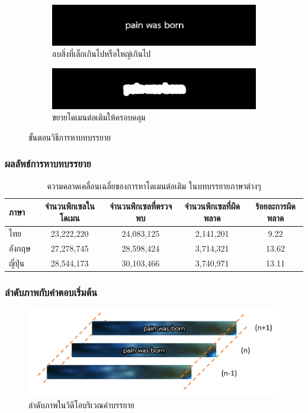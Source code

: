 \documentclass[xcolor=dvipsnames, xetex,serif]{beamer}
\numberwithin{equation}{section}
\begin{document}
\begin{frame}
\begin{figure}[H]
\begin{subfigure}{0.4\linewidth}
                \centering
                \includegraphics[width=0.8\linewidth]{images/subtitle_detection/detection-erode-opening.png}
                \caption{ลบสิ่งที่เล็กเกินไปหรือใหญ่เกินไป}
            \end{subfigure}
            \begin{subfigure}{0.4\linewidth}
                \centering
                \includegraphics[width=0.8\linewidth]{images/subtitle_detection/detection-stoke.png}
                \caption{ขยายโดเมนต่อเติมให้ครอบคลุม}
            \end{subfigure}
            \caption{ขั้นตอนวิธีการหาบทบรรยาย}
        \end{figure}
    \end{frame}
    \begin{frame}
        \frametitle{ผลลัพธ์การหาบทบรรยาย}
        \begin{table}[H]
            \centering
            \footnotesize
            \begin{tabular}[ht]{|l|c|c|c|c|}
                \hline
                ภาษา  & จำนวนพิกเซลในโดเมน & จำนวนพิกเซลที่ตรวจพบ & จำนวนพิกเซลที่ผิดพลาด & ร้อยละการผิดพลาด \\
                \hline
                ไทย & 23,222,220 & 24,083,125 & 2,141,201 & 9.22 \\
                อังกฤษ & 27,278,745 & 28,598,424 & 3,714,321 & 13.62 \\
                ญี่ปุ่น & 28,544,173 & 30,103,466 & 3,740,971 & 13.11 \\
                \hline
            \end{tabular}
            \caption{ความคลาดเคลื่อนเฉลี่ยของการหาโดเมนต่อเติม ในบทบรรยายภาษาต่างๆ}
        \end{table}	
    \end{frame}
    \begin{frame}
        \frametitle{ลำดับภาพกับคำตอบเริ่มต้น}
        \begin{figure}[H]
            \centering
            \includegraphics[width=0.8\linewidth]{images/skipborrow/frame_sequence.png}
            \caption{ลำดับภาพในวิดีโอบริเวณคำบรรยาย}
        \end{figure}
    \end{frame}
\end{document}
